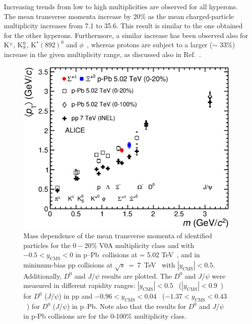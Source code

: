 Increasing trends from low to high multiplicities are observed for all hyperons. The mean transverse momenta increase by 20\% as the mean charged-particle multiplicity increases from 7.1 to 35.6. This result is similar to the one obtained for the other hyperons. Furthermore, a similar increase has been observed also for K$^{\pm}$, K$_{\rm{S}}^{0}$, K$^{*}(892)^0$ and $\phi$~\cite{cite:KphipPb}, whereas protons are subject to a larger ($\sim$ 33\%) increase in the given multiplicity range, as discussed also in Ref.~\cite{cite:lambda_pPb}. 


\begin{figure}[htbp]
\begin{center}
\includegraphics[width=10.cm]{./Version1/FigChapter6/mpt/mpt_mass.eps}
\caption{Mass dependence of the mean transverse momenta of identified particles for the $0-20$\% V0A multiplicity class and with $-0.5<y_{\mathrm{CMS}}<0$ in p--Pb~collisions at \snn = 5.02 TeV~\cite{cite:lambda_pPb, cite:Xi_pPb}, and 
  in minimum-bias pp collisions at $\sqrt{s}$~=~7~TeV~\cite{cite:Xi_pp} with $|y_{\mathrm{CMS}}|<0.5$. Additionally, $D^0$ and $J$/$\psi$ results are plotted. The $D^0$ and $J$/$\psi$ were measured in different rapidity ranges: $|y_{\mathrm{CMS}}|<0.5$~\cite{cite:D0} 
  ($|y_{\mathrm{CMS}}|<0.9$~\cite{cite:Jpsi_pp}) for $D^0$ ($J$/$\psi$) in pp and $-0.96 < y_{\mathrm{CMS}}< 0.04$~\cite{cite:D0} ($-1.37<y_{\mathrm{CMS}}<0.43$~\cite{cite:Jpsi_pPb}) 
  for $D^0$ ($J$/$\psi$) in p--Pb. Note also that the results for $D^0$ and $J$/$\psi$ in p-Pb collisions are for the 0-100\% multiplicity class.}
  \label{fig:mean_pt_vs_mass}
 \end{center}
\end{figure}


